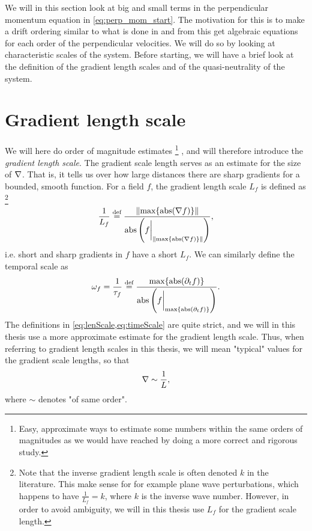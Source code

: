We will in this section look at big and small terms in the perpendicular momentum equation in \cref{eq:perp_mom_start}.
The motivation for this is to make a drift ordering similar to what is done in \cite{Fitzpatrick2014book} and from this get algebraic equations for each order of the perpendicular velocities.
We will do so by looking at characteristic scales of the system.
Before starting, we will have a brief look at the definition of the gradient length scales and of the quasi-neutrality of the system.

\section{Gradient length scale}
We will here do order of magnitude estimates%
\footnote{
    Easy, approximate ways to estimate some numbers within the same orders of magnitudes as we would have reached by doing a more correct and rigorous study.
}%
, and will therefore introduce the \emph{gradient length scale}.
The gradient scale length serves as an estimate for the size of $\nabla$.
That is, it tells us over how large distances there are sharp gradients for a bounded, smooth function.
For a field $f$, the gradient length scale $L_f$ is defined as%
\footnote{
    Note that the inverse gradient length scale is often denoted $k$ in the literature.
    This make sense for for example plane wave perturbations, which happens to have $\frac{1}{L_f}=k$, where $k$ is the inverse wave number.
    However, in order to avoid ambiguity, we will in this thesis use $L_f$ for the gradient scale length.
}%
%
\begin{align}
    \frac{1}{L_f} \overset{\text{def}}{=} \frac{\|\text{max}\{\operatorname{abs}(\nabla f)\}\|}{\operatorname{abs}\left(f\bigg|_{\|\text{max}\{\operatorname{abs}(\nabla f)\}\|}\right)},
    \label{eq:lenScale}
\end{align}
%
i.e. short and sharp gradients in $f$ have a short $L_f$.
We can similarly define the temporal scale as
%
\begin{align}
    \omega_f = \frac{1}{\tau_f} \overset{\text{def}}{=} \frac{\text{max}\{\operatorname{abs}(\partial_t f)\}}{\operatorname{abs}\left(f\bigg|_{\text{max}\{\operatorname{abs}(\partial_t f)\}}\right)}.
    \label{eq:timeScale}
\end{align}
%
The definitions in \cref{eq:lenScale,eq:timeScale} are quite strict, and we will in this thesis use a more approximate estimate for the gradient length scale.
Thus, when referring to gradient length scales in this thesis, we will mean "typical" values for the gradient scale lengths, so that
%
\begin{align*}
    \nabla \sim \frac{1}{L},
\end{align*}
%
where $\sim$ denotes "of same order".

